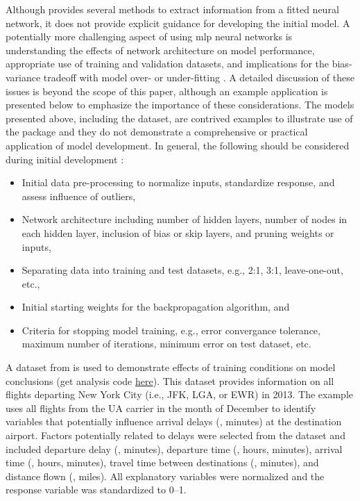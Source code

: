 \documentclass[article,shortnames]{jss}
\begin{document}
Although  provides several methods to extract information from a fitted neural network, it does not provide explicit guidance for developing the initial model.  A potentially more challenging aspect of using \ac{mlp} neural networks is understanding the effects of network architecture on model performance, appropriate use of training and validation datasets, and implications for the bias-variance tradeoff with model over- or under-fitting \citep{Maier00}.  A detailed discussion of these issues is beyond the scope of this paper, although an example application is presented below to emphasize the importance of these considerations.  The models presented above, including the  dataset, are contrived examples to illustrate use of the  package and they do not demonstrate a comprehensive or practical application of model development.  In general, the following should be considered during initial development \citep{Ripley96, Lek00, Maier00}:
\begin{itemize}
\item Initial data pre-processing to normalize inputs, standardize response, and assess influence of outliers,
\item Network architecture including number of hidden layers, number of nodes in each hidden layer, inclusion of bias or skip layers, and pruning weights or inputs,
\item Separating data into training and test datasets, e.g., 2:1, 3:1, leave-one-out, etc., 
\item Initial starting weights for the backpropagation algorithm, and
\item Criteria for stopping model training, e.g., error convergance tolerance, maximum number of iterations, minimum error on test dataset, etc.
\end{itemize}

A dataset from  \citep{Wickham14b} is used to demonstrate effects of training conditions on model conclusions (get analysis code \href{https://raw.githubusercontent.com/fawda123/nnt_manu/master/flightimp.R}{here}).  This dataset provides information on all flights departing New York City (i.e., JFK, LGA, or EWR) in 2013.  The example uses all flights from the UA carrier in the month of December to identify variables that potentially influence arrival delays (, minutes) at the destination airport.  Factors potentially related to delays were selected from the dataset and included departure delay (, minutes), departure time (, hours, minutes), arrival time (, hours, minutes), travel time between destinations (, minutes), and distance flown (, miles).  All explanatory variables were normalized and the response variable was standardized to 0--1.
\end{document}
